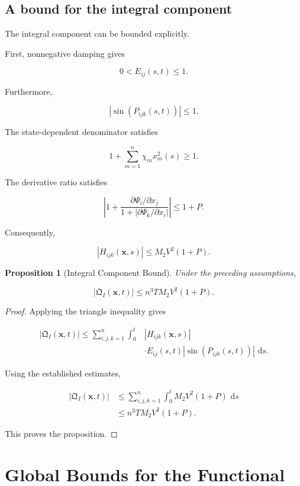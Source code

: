 \documentclass[12pt]{article}
\numberwithin{equation}{section}
\newcommand{\Q}{\mathfrak{Q}}
\newcommand{\dd}{\,\mathrm{d}}
\newtheorem{proposition}[theorem]{Proposition}
\theoremstyle{definition}
\theoremstyle{remark}
\begin{document}
\subsection{A bound for the integral component}

The integral component can be bounded
explicitly.

First, nonnegative damping gives

\[
0<E_{ij}(s,t)\leq1.
\]

Furthermore,

\[
|\sin(P_{ijk}(s,t))|\leq1.
\]

The state-dependent denominator satisfies

\[
1+\sum_{m=1}^{n}\chi_mx_m^2(s)\geq1.
\]

The derivative ratio satisfies

\[
\left|
1+
\frac{
\partial\Psi_i/\partial x_j
}{
1+
|\partial\Psi_k/\partial x_i|
}
\right|
\leq1+P.
\]

Consequently,

\[
|H_{ijk}(\mathbf{x},s)|
\leq M_2V^2(1+P).
\]

\begin{proposition}[Integral Component Bound]

Under the preceding assumptions,

\[
|\Q_I(\mathbf{x},t)|
\leq
n^3TM_2V^2(1+P).
\]

\end{proposition}

\begin{proof}

Applying the triangle inequality gives

\[
\begin{aligned}
|\Q_I(\mathbf{x},t)|
\leq
\sum_{i,j,k=1}^{n}
\int_0^t
&
|H_{ijk}(\mathbf{x},s)|
\\
&\cdot E_{ij}(s,t)
|\sin(P_{ijk}(s,t))|
\,\dd s.
\end{aligned}
\]

Using the established estimates,

\[
\begin{aligned}
|\Q_I(\mathbf{x},t)|
&\leq
\sum_{i,j,k=1}^{n}
\int_0^t
M_2V^2(1+P)\,\dd s
\\
&\leq
n^3TM_2V^2(1+P).
\end{aligned}
\]

This proves the proposition.

\end{proof}


\section{Global Bounds for the Functional}
\end{document}
